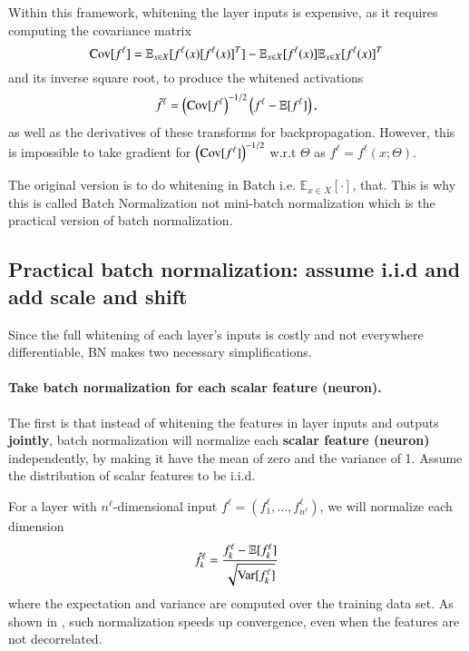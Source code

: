 Within this framework, whitening the layer inputs is expensive, as it requires
computing the covariance matrix 
\begin{equation}
{\rm Cov}[f^\ell] = \mathbb E_{ x \in X} [f^\ell(x) [f^\ell(x)]^T]-\mathbb E_{ x \in X} [f^{\ell}(x)]\mathbb E_{ x \in X} [f^\ell(x)]^T
\end{equation}
and its inverse square root, to produce the whitened activations 
\begin{equation}
\tilde  f^\ell = \left({\rm Cov}[f^\ell \right)^{-1/2}\left(f^\ell-\mathbb E[f^\ell]\right),
\end{equation}
as well as the derivatives of these transforms for backpropagation. 
However, this is impossible to take gradient for $\left({\rm Cov}[f^\ell] \right)^{-1/2}$
w.r.t $\Theta$ as $ f^\ell = f^\ell(x; \Theta)$. 

The original version is to do whitening in Batch i.e. $\mathbb E_{ x \in X} [\cdot ]$, that. This
is why this is called Batch Normalization not mini-batch normalization which 
is the practical version of batch normalization.

\subsection{Practical batch normalization: assume i.i.d and add scale and shift }
Since the full whitening of each layer's inputs is costly and not
everywhere differentiable, BN makes two necessary simplifications. 

\paragraph{Take batch normalization for each scalar feature (neuron).}

The first is that instead of whitening the features in layer
inputs and outputs {\bf jointly}, batch normalization will normalize each {\bf scalar feature (neuron)}
independently, by making it have the mean of zero and the variance of
1.   Assume the distribution of
scalar features to be i.i.d. 


For a layer with $n^\ell$-dimensional input $f^\ell = (f^\ell_1, \ldots,  f^\ell_{n^\ell})$, we
will normalize each dimension 
$$ \hat{f}^\ell_k = \frac{f^\ell_k-\mathbb E [ f^\ell_k]}{
	\sqrt{{\rm Var}[f^\ell_k]}}$$
where the expectation and variance are
computed over the training data set. As shown in
\cite{lecun1998neural}, such normalization speeds up convergence,
even when the  features are not decorrelated.

